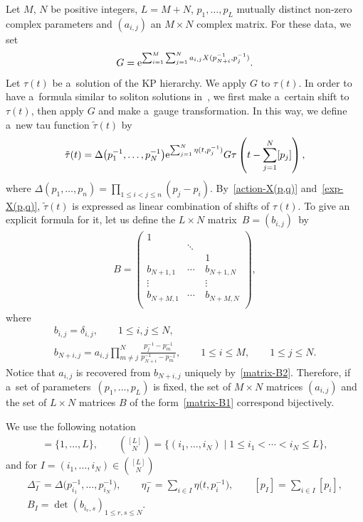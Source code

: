 \documentclass[pdftex]{sigma}
\numberwithin{equation}{section}
\theoremstyle{definition}
\begin{document}
Let $M$, $N$ be positive integers, $L=M+N$,
$p_1,\dots ,p_L$ mutually distinct non-zero complex parameters and
$(a_{i,j})$ an $M\times N$ complex matrix. For these data, we set
\begin{gather}
G={\rm e}^{\sum_{i=1}^M\sum_{j=1}^N a_{i,j} X(p_{N+i}^{-1},p_j^{-1})}.
\label{VO-G}
\end{gather}
Let $\tau(t)$ be a~solution of the KP hierarchy. We apply $G$ to $\tau(t)$.
In order to have a~formula similar to soliton solutions in~\cite{Kodama2017},
we first make a~certain shift to $\tau(t)$, then apply $G$ and make a~gauge transformation.
In this way, we define a~new tau function $\tilde{\tau}(t)$ by
\begin{gather}
\tilde{\tau}(t)=\Delta\bigl(p_1^{-1},\dots ,p_N^{-1}\bigr){\rm e}^{\sum_{j=1}^N\eta(t,p_j^{-1})}
G \tau\left(t-\sum_{j=1}^N[p_j]\right),
\label{tau-VO}
\end{gather}
where
$
\Delta(p_1,\dots ,p_n)=\prod_{1\leq i<j\leq n}(p_j-p_i)$.
By~\eqref{action-X(p,q)} and~\eqref{exp-X(p,q)}, $\tilde{\tau}(t)$ is expressed as
linear combination of shifts of $\tau(t)$.
To give an explicit formula for it, let us define the $L\times N$ matrix~${B=(b_{i,j})}$~by
\begin{gather}
 B=\left(
 \begin{matrix}
 1&\quad&\quad\\
 \quad&\ddots&\quad\\
 \quad&\quad&1\\
 b_{N+1,1}&\cdots&b_{N+1,N}\\
 \vdots&\quad&\vdots\\
 b_{N+M,1}&\cdots&b_{N+M,N}\\
 \end{matrix}
 \right),
 \label{matrix-B1}
 \end{gather}
 where
\begin{gather}
b_{i,j}=\delta_{i,j}, \qquad 1\leq i, j\leq N,
\nonumber
\\
b_{N+i,j}=a_{i,j}\prod_{m\neq j}^N\frac{p_j^{-1}-p_m^{-1}}{p_{N+i}^{-1}-p_m^{-1}},
 \qquad 1\leq i\leq M,\qquad 1\leq j\leq N.
\label{matrix-B2}
\end{gather}
Notice that $a_{i,j}$ is recovered from $b_{N+i,j}$ uniquely by~\eqref{matrix-B2}.
Therefore, if a~set of parameters~${(p_1,\dots ,p_L)}$ is fixed, the set of $M\times N$
matrices $(a_{i,j})$ and the set of $L\times N$ matrices $B$ of the form~\eqref{matrix-B1}
 correspond bijectively.

We use the following notation
\begin{gather*}
[L]=\{1,\dots ,L\},
\qquad
\binom{[L]}{N}=\{(i_1,\dots ,i_N) \mid 1\leq i_1<\cdots<i_N\leq L\},
\end{gather*}
and for $I=(i_1,\dots ,i_N)\in \binom{[L]}{N}$
\begin{gather*}
\Delta^{-}_I=\Delta\bigl(p_{i_1}^{-1},\dots ,p_{i_N}^{-1}\bigr),
\qquad
\eta_I^{-}=\sum_{i\in I} \eta\bigl(t,p_i^{-1}\bigr),
\qquad
[p_I]=\sum_{i\in I} [p_i],
\\
B_I=\det(b_{i_r,s})_{1\leq r,s\leq N}.
\end{gather*}
\end{document}
